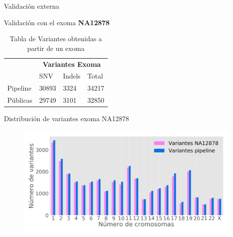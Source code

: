 \documentclass[xcolor=dvipsnames]{beamer}
\begin{document}
\begin{frame}{Validación externa}

Validación con el exoma \textbf{NA12878}
\begin{table}[H]
	\centering  
	\begin{tabular}{l|l|l|l|}
		\cline{2-4}
		& \multicolumn{3}{c|}{\textbf{Variantes Exoma}} \\ \cline{2-4} 
		& SNV           & Indels         & Total        \\ \hline
		\multicolumn{1}{|l|}{Pipeline} & 30893         & 3324           & 34217        \\ \hline
		\multicolumn{1}{|l|}{Públicas} & 29749         & 3101           & 32850        \\ \hline
	\end{tabular}
	\caption{Tabla de Variantes obtenidas a partir de un exoma}
	\label{tabla:tabla2}
\end{table} 
\end{frame}

\begin{frame}{Distribución de variantes exoma NA12878}
\begin{figure}
	\includegraphics[width=1\textwidth]{validacion2.png}
	\end{figure}
\end{frame}
\end{document}

